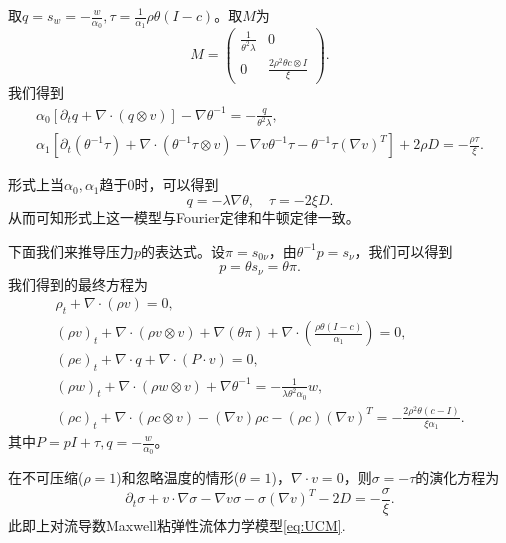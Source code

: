 	取$q=s_w=-\frac{ w}{\alpha_0},\tau = \frac{1}{\alpha_1} \rho \theta (I-c)$。取$M$为
	\begin{equation*}
		M = \left( \begin{array}{ccc} 
			\frac{1}{\theta^2 \lambda} & 0 \\
			0 &  \frac{2 \rho^2 \theta c \otimes I}{\xi}   
		\end{array} \right).
	\end{equation*}
	我们得到
	\begin{eqnarray*}
		\alpha_0 [\partial_t q +  \nabla \cdot (q \otimes v)] - \nabla \theta^{-1} = -\frac{q}{\theta^2 \lambda}, \\
		\alpha_1[\partial_t (\theta^{-1} {\tau}) + \nabla \cdot (\theta^{-1} {\tau} \otimes v) - \nabla v \theta^{-1} \tau - \theta^{-1}\tau (\nabla v)^T] + 2 \rho D = -\frac{{\rho \tau}}{\xi}.
	\end{eqnarray*}
	
	形式上当$\alpha_0, \alpha_1$趋于0时，可以得到
	\begin{equation*}
		q = -\lambda \nabla \theta, \quad \tau = - 2 \xi {D} .
	\end{equation*}
	从而可知形式上这一模型与Fourier定律和牛顿定律一致。
	
	下面我们来推导压力$p$的表达式。设$\pi= s_{0\nu}$，由$\theta^{-1} p = s_\nu$，我们可以得到
	\begin{equation*}
		p = \theta s_\nu = \theta \pi . 
	\end{equation*}
	我们得到的最终方程为
	\begin{subequations}
		\begin{align*}
			\rho_t + \nabla \cdot (\rho v) = 0 ,\\
			(\rho v)_t + \nabla \cdot (\rho v \otimes v) + \nabla (\theta \pi)  + \nabla \cdot ( \frac{\rho \theta(I-c)}{\alpha_1}) =0 ,\\
			(\rho e)_t + \nabla \cdot q + \nabla \cdot (P \cdot v) = 0, \\
			(\rho w)_t + \nabla \cdot (\rho w \otimes v) + \nabla \theta^{-1} = -\frac{1}{\lambda \theta^2 \alpha_0} w, \\
			(\rho c)_t +  \nabla \cdot (\rho c \otimes v) - (\nabla v) \rho c - (\rho c) (\nabla v)^T  = -\frac{2 \rho^2 \theta (c-I) }{\xi \alpha_1}.
		\end{align*}
	\end{subequations}
	其中$P = pI + \tau,q =-\frac{w}{\alpha_0}$。

	在不可压缩($\rho=1$)和忽略温度的情形($\theta=1$)，$\nabla \cdot v = 0$，则$\sigma = -\tau$的演化方程为
	\begin{equation*}
		\partial_t \sigma + v \cdot \nabla \sigma - \nabla v \sigma - \sigma (\nabla v)^T - 2 D = -\frac{\sigma}{\xi}. 
	\end{equation*}
	此即上对流导数Maxwell粘弹性流体力学模型\eqref{eq:UCM}.	

